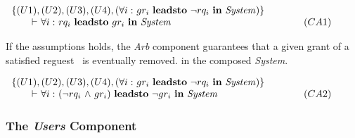 \begin{description}
      \cn $\begin{array}{lr}
        \{(U1), (U2), (U3), (U4),
          (\mbox{$\forall i:$}\ \mbox{$gr_{i}$}\ \mbox{\bf leadsto}\ \mbox{$\neg$}\mbox{$rq_i$}\ \mbox{\bf in}\ {\it System})\}\\
          \mbox{ \hspace{6mm}} \mbox{$\vdash$}\ \mbox{$\forall i:$}\ \mbox{$rq_i$}\ \mbox{\bf leadsto}\ \mbox{$gr_{i}$}\ \mbox{\bf in}\ {\it System} &
          \hspace{30pt} (CA1)\\
      \end{array}$

      If the assumptions holds, the {\it Arb} component guarantees
      that a given grant of a satisfied reguest \rqi\ is eventually removed.
      in the composed {\it System}.

      \cn $\begin{array}{lr}
        \{(U1), (U2), (U3), (U4),
        (\mbox{$\forall i:$}\ \mbox{$gr_{i}$}\ \mbox{\bf leadsto}\ \mbox{$\neg$}\mbox{$rq_i$}\ \mbox{\bf in}\ {\it System})\}\\
         \mbox{ \hspace{6mm}} \mbox{$\vdash$}\
           \mbox{$\forall i:$}\ (\mbox{$\neg$}\mbox{$rq_i$}\ \mbox{$\wedge$}\ \mbox{$gr_{i}$})\ \mbox{\bf leadsto}\ \mbox{$\neg$}\mbox{$gr_{i}$}\
                       \mbox{\bf in}\ {\it System} &
          \hspace{30pt} (CA2)\\
      \end{array}$
\end{description}

\subsubsection{The {\it Users} Component}

